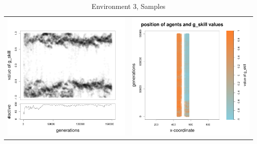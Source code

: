 \documentclass[a4paper,10pt]{article}
\begin{document}
\begin{table}[H]
\caption{Environment 3, Samples}
\centering
\begin{tabular}{cc}
\includegraphics[width=\imgSize]{../images/5StaticEnv/Gplot5_staticEnv3}&\includegraphics[width=\imgSize]{../images/5StaticEnv/Gplot5Static_staticEnv3}\\

\end{tabular}
\end{table}
\end{document}
